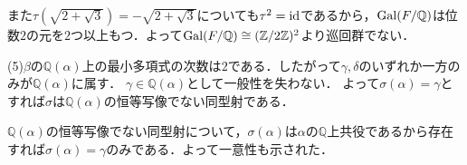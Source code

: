 \documentclass[
		book,
		head_space=20mm,
		foot_space=20mm,
		gutter=10mm,
		line_length=190mm
]{jlreq}
\begin{document}
また$\tau(\sqrt{2+\sqrt{3}})=-\sqrt{2+\sqrt{3}}$についても$\tau^2=\mathop{\mathrm{id}}$であるから，$\mathop{\mathrm{Gal}}(F/\mathbb{Q})$は位数$2$の元を$2$つ以上もつ．よって$\mathop{\mathrm{Gal}}(F/\mathbb{Q})\cong (\mathbb{Z}/2\mathbb{Z})^2$より巡回群でない．

(5)$\beta$の$\mathbb{Q}(\alpha)$上の最小多項式の次数は$2$である．したがって$\gamma,\delta$のいずれか一方のみが$\mathbb{Q}(\alpha)$に属す．
$\gamma\in \mathbb{Q}(\alpha)$として一般性を失わない．
よって$\sigma(\alpha)=\gamma$とすれば$\sigma$は$\mathbb{Q}(\alpha)$の恒等写像でない同型射である．

$\mathbb{Q}(\alpha)$の恒等写像でない同型射について，$\sigma(\alpha)$は$\alpha$の$\mathbb{Q}$上共役であるから存在すれば$\sigma(\alpha)=\gamma$のみである．よって一意性も示された．
\end{document}
